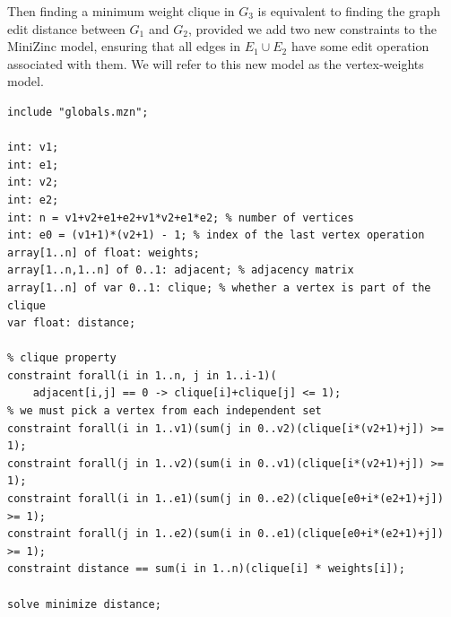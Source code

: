 \documentclass{article}
\theoremstyle{definition}
\begin{document}
Then finding a minimum weight clique in $G_3$ is equivalent to finding the graph edit distance between $G_1$ and $G_2$, provided we add two new constraints to the MiniZinc model, ensuring that all edges in $E_1 \cup E_2$ have some edit operation associated with them. We will refer to this new model as the vertex-weights model.
\begin{lstlisting}
include "globals.mzn";

int: v1;
int: e1;
int: v2;
int: e2;
int: n = v1+v2+e1+e2+v1*v2+e1*e2; % number of vertices
int: e0 = (v1+1)*(v2+1) - 1; % index of the last vertex operation
array[1..n] of float: weights;
array[1..n,1..n] of 0..1: adjacent; % adjacency matrix
array[1..n] of var 0..1: clique; % whether a vertex is part of the clique
var float: distance;

% clique property
constraint forall(i in 1..n, j in 1..i-1)(
    adjacent[i,j] == 0 -> clique[i]+clique[j] <= 1);
% we must pick a vertex from each independent set
constraint forall(i in 1..v1)(sum(j in 0..v2)(clique[i*(v2+1)+j]) >= 1);
constraint forall(j in 1..v2)(sum(i in 0..v1)(clique[i*(v2+1)+j]) >= 1);
constraint forall(i in 1..e1)(sum(j in 0..e2)(clique[e0+i*(e2+1)+j]) >= 1);
constraint forall(j in 1..e2)(sum(i in 0..e1)(clique[e0+i*(e2+1)+j]) >= 1);
constraint distance == sum(i in 1..n)(clique[i] * weights[i]);

solve minimize distance;
\end{lstlisting}
\end{document}
